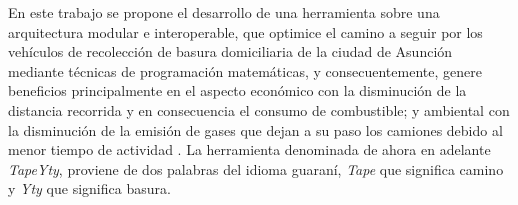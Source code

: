 \documentclass[spanish, conference]{IEEEtran}
\begin{document}
En este trabajo se propone el desarrollo de una herramienta sobre una arquitectura modular e interoperable, que optimice el camino a seguir por los vehículos de recolección de basura domiciliaria de la ciudad de Asunción mediante técnicas de programación matemáticas, y consecuentemente, genere beneficios principalmente en el aspecto económico con la disminución de la distancia recorrida y en consecuencia el consumo de combustible; y ambiental con la disminución de la emisión de gases que dejan a su paso los camiones debido al menor tiempo de actividad \cite{Vu2018ParameterModel}. La herramienta denominada de ahora en adelante \textit{TapeYty}, proviene de dos palabras del idioma guaraní, \textit{Tape} que significa camino y \textit{Yty} que significa basura.


\end{document}
